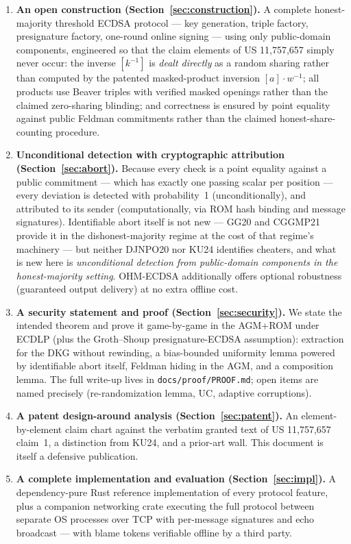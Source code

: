 \documentclass[11pt]{article}
\theoremstyle{plain}
\theoremstyle{definition}
\theoremstyle{remark}
\newcommand{\share}[1]{[#1]}
\begin{document}
\begin{enumerate}[leftmargin=1.6em]
\item \textbf{An open construction (Section~\ref{sec:construction}).} A complete honest-majority threshold ECDSA protocol --- key generation, triple factory, presignature factory, one-round online signing --- using only public-domain components, engineered so that the claim elements of US 11,757,657 simply never occur: the inverse $\share{k^{-1}}$ is \emph{dealt directly} as a random sharing rather than computed by the patented masked-product inversion $\share{a}\cdot w^{-1}$; all products use Beaver triples with verified masked openings rather than the claimed zero-sharing blinding; and correctness is ensured by point equality against public Feldman commitments rather than the claimed honest-share-counting procedure.
\item \textbf{Unconditional detection with cryptographic attribution (Section~\ref{sec:abort}).} Because every check is a point equality against a public commitment --- which has exactly one passing scalar per position --- every deviation is detected with probability~1 (unconditionally), and attributed to its sender (computationally, via ROM hash binding and message signatures). Identifiable abort itself is not new --- GG20 and CGGMP21 provide it in the dishonest-majority regime at the cost of that regime's machinery --- but neither DJNPO20 nor KU24 identifies cheaters, and what is new here is \emph{unconditional detection from public-domain components in the honest-majority setting}. OHM-ECDSA additionally offers optional robustness (guaranteed output delivery) at no extra offline cost.
\item \textbf{A security statement and proof (Section~\ref{sec:security}).} We state the intended theorem and prove it game-by-game in the AGM+ROM under ECDLP (plus the Groth--Shoup presignature-ECDSA assumption): extraction for the DKG without rewinding, a bias-bounded uniformity lemma powered by identifiable abort itself, Feldman hiding in the AGM, and a composition lemma. The full write-up lives in \texttt{docs/proof/PROOF.md}; open items are named precisely (re-randomization lemma, UC, adaptive corruptions).
\item \textbf{A patent design-around analysis (Section~\ref{sec:patent}).} An element-by-element claim chart against the verbatim granted text of US 11,757,657 claim~1, a distinction from KU24, and a prior-art wall. This document is itself a defensive publication.
\item \textbf{A complete implementation and evaluation (Section~\ref{sec:impl}).} A dependency-pure Rust reference implementation of every protocol feature, plus a companion networking crate executing the full protocol between separate OS processes over TCP with per-message signatures and echo broadcast --- with blame tokens verifiable offline by a third party.
\end{enumerate}
\end{document}
